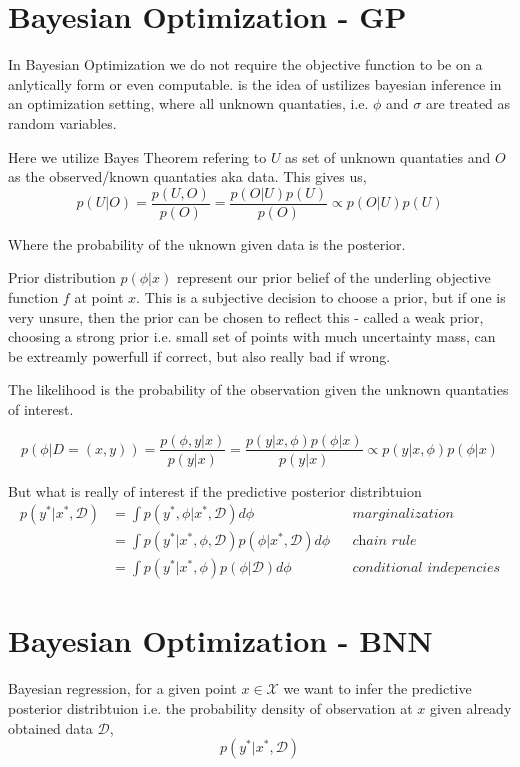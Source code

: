 \section{Bayesian Optimization - GP}
In Bayesian Optimization we do not require the objective function to be on a anlytically 
form or even computable. 
is the idea of ustilizes bayesian inference in an optimization setting, where all unknown quantaties, i.e. 
$\phi$ and $\sigma$ are treated as random variables. 

Here we utilize Bayes Theorem refering to $U$ as set of unknown quantaties and $O$ as the observed/known quantaties
aka data. This gives us,  
$$p(U|O) = \frac{p(U,O)}{p(O)} = \frac{p(O|U)p(U)}{p(O)} \propto p(O|U)p(U) $$

Where the probability of the uknown given data is the posterior.

Prior distribution $p(\phi | x)$ represent our prior belief of the underling objective function $f$ at 
point $x$. This is a subjective decision to choose a prior, but if one is very unsure, then the prior can 
be chosen to reflect this - called a weak prior, choosing a strong prior i.e. small set of points with much 
uncertainty mass, can be extreamly powerfull if correct, but also really bad if wrong. 

The likelihood is the probability of the observation given the unknown quantaties of interest. 

$$p(\phi|D=(x,y)) = \frac{p(\phi,y|x)}{p(y|x)} 
= \frac{p(y|x,\phi)p(\phi|x)}{p(y|x)} \propto p(y|x,\phi)p(\phi|x) $$

But what is really of interest if the predictive posterior distribtuion
\begin{align*}
    p(y^*|x^*, \mathcal{D}) &= \int p(y^*,\phi|x^*,  \mathcal{D}) d\phi &&\textit{marginalization}\\
    &= \int p(y^*|x^*, \phi, \mathcal{D}) p(\phi|x^*, \mathcal{D}) d\phi &&\textit{chain rule} \\
    &= \int p(y^*|x^*, \phi) p(\phi| \mathcal{D}) d\phi &&\textit{conditional indepencies}
\end{align*}

\section{Bayesian Optimization - BNN}


Bayesian regression, for a given point $x \in \mathcal{X}$ we want to infer the predictive posterior distribtuion
i.e. the probability density of observation at $x$ given already obtained data $\mathcal{D}$, 
$$p(y^*| x^*, \mathcal{D})$$

